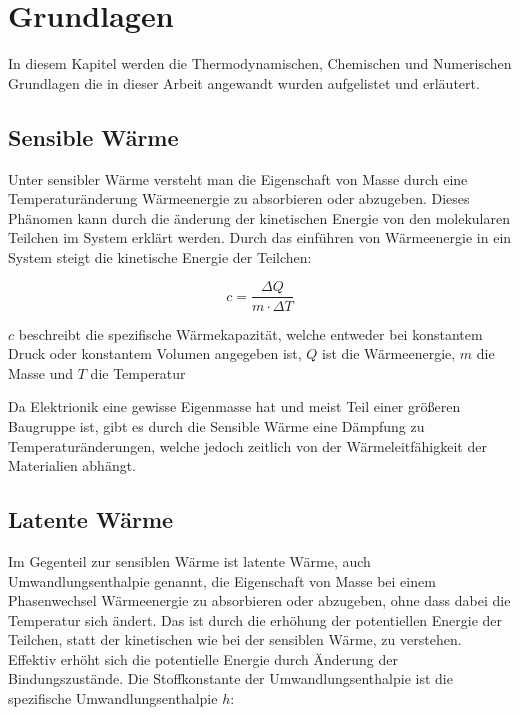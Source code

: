 \chapter{Grundlagen}
\label{chap:Grundlagen}			%

In diesem Kapitel werden die Thermodynamischen, Chemischen und Numerischen Grundlagen die in dieser Arbeit angewandt wurden aufgelistet
und erläutert.

\section{Sensible Wärme}\label{sec:sensiblewaerme}

Unter sensibler Wärme versteht man die Eigenschaft von Masse durch eine Temperaturänderung Wärmeenergie zu absorbieren oder abzugeben. Dieses
Phänomen kann durch die änderung der kinetischen Energie von den molekularen Teilchen im System erklärt werden. Durch das einführen von
Wärmeenergie in ein System steigt die kinetische Energie der Teilchen:

\begin{equation}
    c = \frac{\Delta Q}{m \cdot \Delta T}
\end{equation}

$c$ beschreibt die spezifische Wärmekapazität, welche entweder bei konstantem Druck oder konstantem Volumen angegeben ist,
$Q$ ist die Wärmeenergie, $m$ die Masse und $T$ die Temperatur

Da Elektrionik eine gewisse Eigenmasse hat und meist Teil einer größeren Baugruppe ist, gibt es durch die Sensible Wärme eine Dämpfung
zu Temperaturänderungen, welche jedoch zeitlich von der Wärmeleitfähigkeit der Materialien abhängt.

\section{Latente Wärme}\label{sec:latentewaerme}

Im Gegenteil zur sensiblen Wärme ist latente Wärme, auch Umwandlungsenthalpie genannt, die Eigenschaft von Masse bei einem Phasenwechsel Wärmeenergie
zu absorbieren oder abzugeben, ohne dass dabei die Temperatur sich ändert. Das ist durch die erhöhung der potentiellen Energie der Teilchen,
statt der kinetischen wie bei der sensiblen Wärme, zu verstehen. Effektiv erhöht sich die potentielle Energie durch Änderung der Bindungszustände.
Die Stoffkonstante der Umwandlungsenthalpie ist die spezifische Umwandlungsenthalpie $h$:

